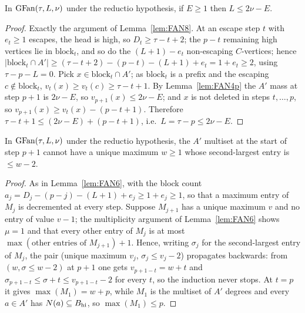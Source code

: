 \begin{lemma}\label{lem:FAN8p}
In $\mathrm{GFan}(\tau,L,\nu)$ under the reductio hypothesis, if $E \ge 1$ then $L \le 2\nu - E$.
\end{lemma}

\begin{proof}
Exactly the argument of Lemma~\ref{lem:FAN8}. At an escape step $t$ with $e_t \ge 1$
escapes, the head is high, so $D_t \ge \tau-t+2$; the $p-t$ remaining high vertices lie in
$\mathrm{block}_t$, and so do the $(L+1)-e_t$ non-escaping $C$-vertices; hence
$|\mathrm{block}_t \cap A'| \ge (\tau-t+2)-(p-t)-(L+1)+e_t = 1 + e_t \ge 2$, using
$\tau - p - L = 0$. Pick $x \in \mathrm{block}_t \cap A'$; as $\mathrm{block}_t$ is a prefix
and the escaping $c \notin \mathrm{block}_t$, $v_t(x) \ge v_t(c) \ge \tau-t+1$. By
Lemma~\ref{lem:FAN4p} the $A'$ mass at step $p+1$ is $2\nu-E$, so $v_{p+1}(x) \le 2\nu-E$;
and $x$ is not deleted in steps $t,\dots,p$, so $v_{p+1}(x) \ge v_t(x)-(p-t+1)$. Therefore
$\tau-t+1 \le (2\nu-E)+(p-t+1)$, i.e.\ $L = \tau-p \le 2\nu-E$.
\end{proof}

\begin{lemma}\label{lem:FAN6p}
In $\mathrm{GFan}(\tau,L,\nu)$ under the reductio hypothesis, the $A'$ multiset at the start of step
$p+1$ cannot have a unique maximum $w \ge 1$ whose second-largest entry is $\le w-2$.
\end{lemma}

\begin{proof}
As in Lemma~\ref{lem:FAN6}, with the block count
$a_j = D_j - (p-j) - (L+1) + e_j \ge 1 + e_j \ge 1$, so that a maximum entry of $M_j$ is
decremented at every step. Suppose $M_{j+1}$ has a unique maximum $v$ and no entry of value
$v-1$; the multiplicity argument of Lemma~\ref{lem:FAN6} shows $\mu = 1$ and that every
other entry of $M_j$ is at most $\max(\text{other entries of } M_{j+1})+1$. Hence, writing
$\sigma_j$ for the second-largest entry of $M_j$, the pair (unique maximum $v_j$,
$\sigma_j \le v_j - 2$) propagates backwards: from $(w,\sigma \le w-2)$ at $p+1$ one gets
$v_{p+1-t} = w+t$ and $\sigma_{p+1-t} \le \sigma + t \le v_{p+1-t}-2$ for every $t$, so the
induction never stops. At $t = p$ it gives $\max(M_1) = w+p$, while $M_1$ is the multiset of
$A'$ degrees and every $a \in A'$ has $N(a) \subseteq B_{\mathrm{hi}}$, so $\max(M_1) \le p$.
\end{proof}

